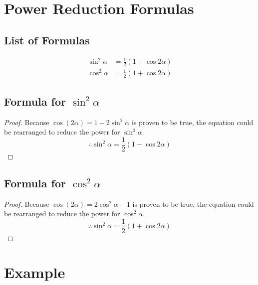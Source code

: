 \documentclass{article}
\begin{document}
\section{Power Reduction Formulas}
\subsection{List of Formulas}
\begin{align*}
    \sin^2\alpha&=\frac{1}{2}(1-\cos2\alpha) \\
    \cos^2\alpha&=\frac{1}{2}(1+\cos2\alpha)
\end{align*}

\subsection{Formula for $\sin^2\alpha$}
\begin{proof}
    Because $\cos(2\alpha)=1-2\sin^2\alpha$ is proven to be true, the equation could be rearranged to reduce the power for $\sin^2\alpha$.
    \[
    \therefore \sin^2\alpha=\frac{1}{2}(1-\cos2\alpha)
    \]
\end{proof}

\subsection{Formula for $\cos^2\alpha$}
\begin{proof}
    Because $\cos(2\alpha)=2\cos^2\alpha-1$ is proven to be true, the equation could be rearranged to reduce the power for $\cos^2\alpha$.
    \[
    \therefore \sin^2\alpha=\frac{1}{2}(1+\cos2\alpha)
    \]
\end{proof}


\section{Example}
\end{document}

